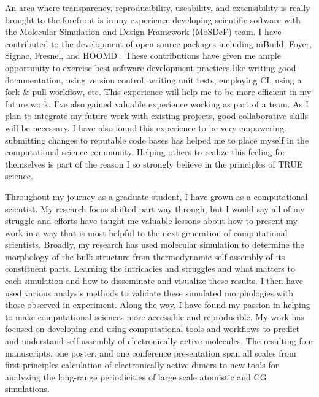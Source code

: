 An area where transparency, reproducibility, useability, and extensibility is really brought to the forefront is in my experience developing scientific software with the Molecular Simulation and Design Framework (MoSDeF) team.
I have contributed to the development of open-source packages including mBuild, Foyer, Signac, Fresnel, and HOOMD \cite{mbuild, foyer, signac, fresnel, hoomd}.
These contributions have given me ample opportunity to exercise best software development practices like writing good documentation, using version control, writing unit tests, employing CI, using a fork \& pull workflow, etc.
This experience will help me to be more efficient in my future work.
I've also gained valuable experience working as part of a team.
As I plan to integrate my future work with existing projects, good collaborative skills will be necessary.
I have also found this experience to be very empowering: submitting changes to reputable code bases has helped me to place myself in the computational science community.
Helping others to realize this feeling for themselves is part of the reason I so strongly believe in the principles of TRUE science.

Throughout my journey as a graduate student, I have grown as a computational scientist. %
My research focus shifted part way through, but I would say all of my struggle and efforts have taught me valuable lessons about how to present my work in a way that is most helpful to the next generation of computational scientists.
Broadly, my research has used molecular simulation to determine the morphology of the bulk structure from thermodynamic self-assembly of its constituent parts. 
Learning the intricacies and struggles and what matters to each simulation and how to disseminate and visualize these results.
I then have used various analysis methods to validate these simulated morphologies with those observed in experiment. 
Along the way, I have found my passion in helping to make computational sciences more accessible and reproducible.
My work has focused on developing and using computational tools and workflows to predict and understand self assembly of electronically active molecules.
The resulting four manuscripts, one poster, and one conference presentation span all scales from first-principles calculation of electronically active dimers to new tools for analyzing the long-range periodicities of large scale atomistic and CG simulations.

